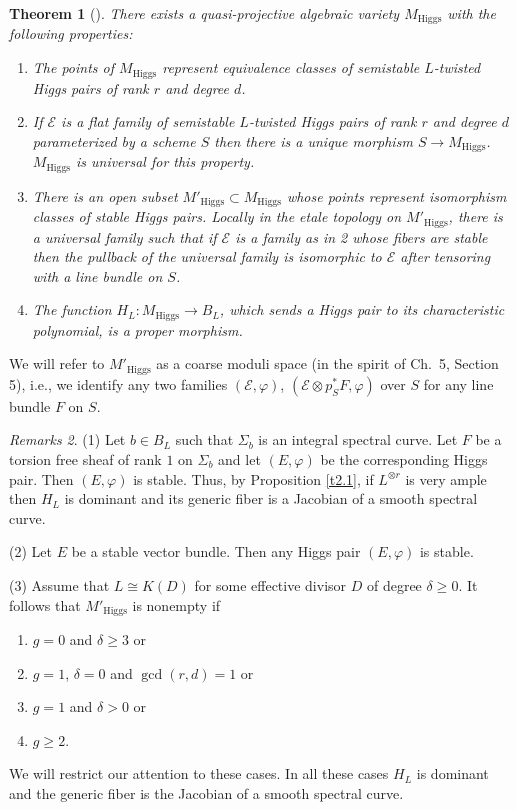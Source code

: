 \documentclass[12pt,a4paper,oneside,english]{smfart}
\newtheorem{thm}{Theorem}[section]
\theoremstyle{definition}
\theoremstyle{remark}
\newtheorem{rems}[thm]{Remarks}
\newcommand{\Hig}{\mathrm{Higgs}}
\newcommand{\MH}{M_{\Hig}}
\newcommand{\MHp}{M'_{\Hig}}
\newcommand{\cE}{\mathcal{E}}
\begin{document}
\begin{thm}[\cite{Sim}]\label{t3.3}
There exists a quasi-projective algebraic variety $\MH$ with the following properties:
\begin{enumerate}
    \item The points of $\MH$ represent equivalence classes of semistable $L$-twisted Higgs pairs of rank $r$ and degree $d$.
    \item If $\cE$ is a flat family of semistable $L$-twisted Higgs pairs of rank $r$ and degree $d$ parameterized by a scheme $S$ then there is a unique morphism $S \to \MH$. $\MH$ is universal for this property.
    \item There is an open subset $\MHp \subset \MH$ whose points represent isomorphism classes of stable Higgs pairs. Locally in the etale topology on $\MHp$, there is a universal family such that if $\cE$ is a family as in 2 whose fibers are stable then the pullback of the universal family is isomorphic to $\cE$ after tensoring with a line bundle on $S$.
    \item The function $H_L \colon \MH \to B_L$, which sends a Higgs pair to its characteristic polynomial, is a proper morphism.
\end{enumerate}
\end{thm}

We will refer to $\MHp$ as a coarse moduli space (in the spirit of \cite{N} Ch.~5, Section 5), i.e., we identify any two families $(\cE, \varphi)$, $(\cE \otimes p_S^* F, \varphi)$ over $S$ for any line bundle $F$ on $S$.

\begin{rems}\label{t3.4}
(1) Let $b \in B_L$ such that $\Sigma_b$ is an integral spectral curve. Let $F$ be a torsion free sheaf of rank $1$ on $\Sigma_b$ and let $(E, \varphi)$ be the corresponding Higgs pair. Then $(E, \varphi)$ is stable. Thus, by Proposition \ref{t2.1}, if $L^{\otimes r}$ is very ample then $H_L$ is dominant and its generic fiber is a Jacobian of a smooth spectral curve.

(2) Let $E$ be a stable vector bundle. Then any Higgs pair $(E, \varphi)$ is stable.

(3) Assume that $L \cong K(D)$ for some effective divisor $D$ of degree $\delta \geqslant 0$. It follows that $\MHp$ is nonempty if
\begin{enumerate}
    \item[(a)] $g = 0$ and $\delta \geqslant 3$ or
    \item[(b)] $g = 1$, $\delta = 0$ and $\gcd(r, d) = 1$ or
    \item[(c)] $g = 1$ and $\delta > 0$ or
    \item[(d)] $g \geqslant 2$.
\end{enumerate}
We will restrict our attention to these cases. In all these cases $H_L$ is dominant and the generic fiber is the Jacobian of a smooth spectral curve.
\end{rems}
\end{document}
